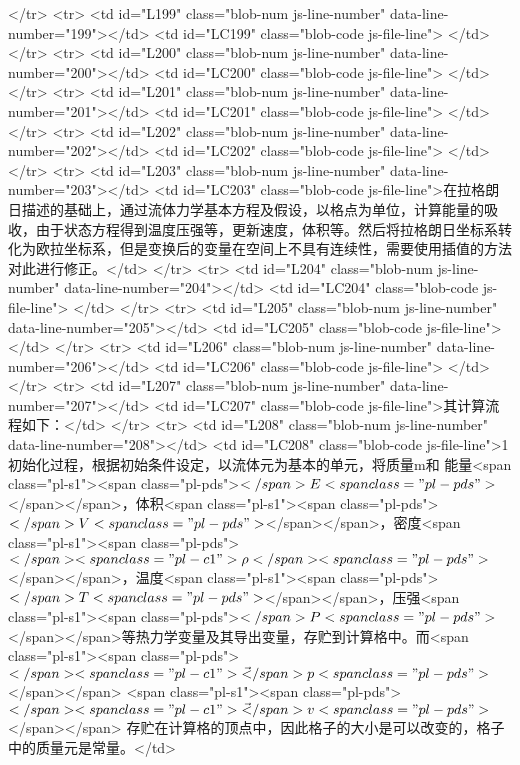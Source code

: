       </tr>
      <tr>
        <td id="L199" class="blob-num js-line-number" data-line-number="199"></td>
        <td id="LC199" class="blob-code js-file-line">
</td>
      </tr>
      <tr>
        <td id="L200" class="blob-num js-line-number" data-line-number="200"></td>
        <td id="LC200" class="blob-code js-file-line">
</td>
      </tr>
      <tr>
        <td id="L201" class="blob-num js-line-number" data-line-number="201"></td>
        <td id="LC201" class="blob-code js-file-line">
</td>
      </tr>
      <tr>
        <td id="L202" class="blob-num js-line-number" data-line-number="202"></td>
        <td id="LC202" class="blob-code js-file-line">
</td>
      </tr>
      <tr>
        <td id="L203" class="blob-num js-line-number" data-line-number="203"></td>
        <td id="LC203" class="blob-code js-file-line">在拉格朗日描述的基础上，通过流体力学基本方程及假设，以格点为单位，计算能量的吸收，由于状态方程得到温度压强等，更新速度，体积等。然后将拉格朗日坐标系转化为欧拉坐标系，但是变换后的变量在空间上不具有连续性，需要使用插值的方法对此进行修正。</td>
      </tr>
      <tr>
        <td id="L204" class="blob-num js-line-number" data-line-number="204"></td>
        <td id="LC204" class="blob-code js-file-line">
</td>
      </tr>
      <tr>
        <td id="L205" class="blob-num js-line-number" data-line-number="205"></td>
        <td id="LC205" class="blob-code js-file-line">
</td>
      </tr>
      <tr>
        <td id="L206" class="blob-num js-line-number" data-line-number="206"></td>
        <td id="LC206" class="blob-code js-file-line">
</td>
      </tr>
      <tr>
        <td id="L207" class="blob-num js-line-number" data-line-number="207"></td>
        <td id="LC207" class="blob-code js-file-line">其计算流程如下：</td>
      </tr>
      <tr>
        <td id="L208" class="blob-num js-line-number" data-line-number="208"></td>
        <td id="LC208" class="blob-code js-file-line">1 初始化过程，根据初始条件设定，以流体元为基本的单元，将质量m和 能量<span class="pl-s1"><span class="pl-pds">$</span>E<span class="pl-pds">$</span></span>，体积<span class="pl-s1"><span class="pl-pds">$</span>V<span class="pl-pds">$</span></span>，密度<span class="pl-s1"><span class="pl-pds">$</span><span class="pl-c1">\rho</span><span class="pl-pds">$</span></span>，温度<span class="pl-s1"><span class="pl-pds">$</span>T<span class="pl-pds">$</span></span>，压强<span class="pl-s1"><span class="pl-pds">$</span>P<span class="pl-pds">$</span></span>等热力学变量及其导出变量，存贮到计算格中。而<span class="pl-s1"><span class="pl-pds">$</span><span class="pl-c1">\vec</span>{p}<span class="pl-pds">$</span></span> <span class="pl-s1"><span class="pl-pds">$</span><span class="pl-c1">\vec</span>{v}<span class="pl-pds">$</span></span> 存贮在计算格的顶点中，因此格子的大小是可以改变的，格子中的质量元是常量。</td>
